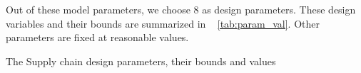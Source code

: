      
Out of these model parameters, we choose 8 as design parameters. These design variables and their bounds are summarized in \tablename ~ \ref{tab:param_val}. Other parameters are fixed at reasonable values.

\begin{table}[]\fontsize{9pt}{10pt}\selectfont
\caption{The Supply chain design parameters, their bounds and values}\label{tab:param_val}
\centering

\end{table}

